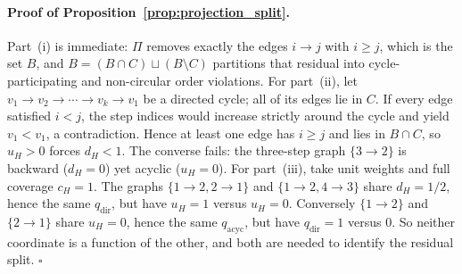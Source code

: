 \paragraph{Proof of Proposition~\ref{prop:projection_split}.}
\label{app:prop_proof}
Part~(i) is immediate: $\Pi$ removes exactly the edges $i\!\to\!j$ with $i\ge j$, which is the set $B$, and $B=(B\cap C)\sqcup(B\setminus C)$ partitions that residual into cycle-participating and non-circular order violations.
For part~(ii), let $v_1\!\to\!v_2\!\to\!\cdots\!\to\!v_k\!\to\!v_1$ be a directed cycle; all of its edges lie in $C$. If every edge satisfied $i<j$, the step indices would increase strictly around the cycle and yield $v_1<v_1$, a contradiction. Hence at least one edge has $i\ge j$ and lies in $B\cap C$, so $u_H>0$ forces $d_H<1$. The converse fails: the three-step graph $\{3\!\to\!2\}$ is backward ($d_H=0$) yet acyclic ($u_H=0$).
For part~(iii), take unit weights and full coverage $c_H=1$. The graphs $\{1\!\to\!2,2\!\to\!1\}$ and $\{1\!\to\!2,4\!\to\!3\}$ share $d_H=1/2$, hence the same $q_{\mathrm{dir}}$, but have $u_H=1$ versus $u_H=0$. Conversely $\{1\!\to\!2\}$ and $\{2\!\to\!1\}$ share $u_H=0$, hence the same $q_{\mathrm{acyc}}$, but have $q_{\mathrm{dir}}=1$ versus $0$. So neither coordinate is a function of the other, and both are needed to identify the residual split. \hfill$\square$


